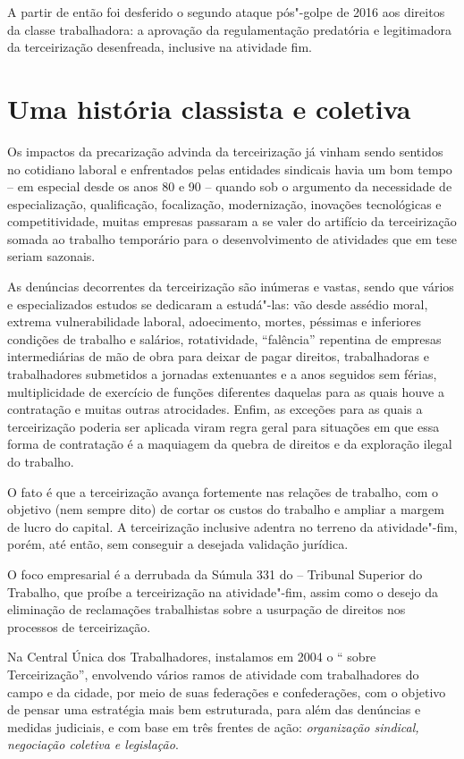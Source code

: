A partir de então foi desferido o segundo ataque pós"-golpe de 2016 aos
direitos da classe trabalhadora: a aprovação da regulamentação
predatória e legitimadora da terceirização desenfreada, inclusive na
atividade fim.

\section{Uma história classista e coletiva}

Os impactos da precarização advinda da terceirização já vinham sendo
sentidos no cotidiano laboral e enfrentados pelas entidades sindicais
havia um bom tempo -- em especial desde os anos 80 e 90 -- quando sob o
argumento da necessidade de especialização, qualificação, focalização,
modernização, inovações tecnológicas e competitividade, muitas empresas
passaram a se valer do artifício da terceirização somada ao trabalho
temporário para o desenvolvimento de atividades que em tese seriam
sazonais.

As denúncias decorrentes da terceirização são inúmeras e vastas, sendo
que vários e especializados estudos se dedicaram a estudá"-las: vão desde
assédio moral, extrema vulnerabilidade laboral, adoecimento, mortes,
péssimas e inferiores condições de trabalho e salários, rotatividade,
``falência'' repentina de empresas intermediárias de mão de obra para
deixar de pagar direitos, trabalhadoras e trabalhadores submetidos a
jornadas extenuantes e a anos seguidos sem férias, multiplicidade de
exercício de funções diferentes daquelas para as quais houve a
contratação e muitas outras atrocidades. Enfim, as exceções para as
quais a terceirização poderia ser aplicada viram regra geral para
situações em que essa forma de contratação é a maquiagem da quebra de
direitos e da exploração ilegal do trabalho.

O fato é que a terceirização avança fortemente nas relações de trabalho,
com o objetivo (nem sempre dito) de cortar os custos do trabalho e
ampliar a margem de lucro do capital. A terceirização inclusive adentra
no terreno da atividade"-fim, porém, até então, sem conseguir a desejada
validação jurídica.

O foco empresarial é a derrubada da Súmula 331 do  -- Tribunal
Superior do Trabalho, que proíbe a terceirização na atividade"-fim, assim
como o desejo da eliminação de reclamações trabalhistas sobre a
usurpação de direitos nos processos de terceirização.

Na Central Única dos Trabalhadores, instalamos em 2004 o ``
sobre Terceirização'', envolvendo vários ramos de atividade com
trabalhadores do campo e da cidade, por meio de suas federações e
confederações, com o objetivo de pensar uma estratégia mais bem
estruturada, para além das denúncias e medidas judiciais, e com base em
três frentes de ação: \emph{organização sindical, negociação coletiva e
legislação}.

